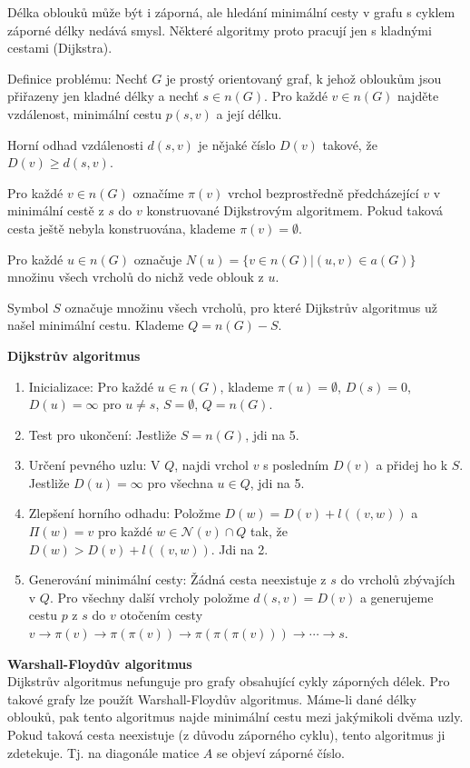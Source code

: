 \documentclass[a4]{report}
\theoremstyle{definition}
\begin{document}
Délka oblouků může být i záporná, ale hledání minimální cesty v grafu s cyklem záporné délky nedává smysl. Některé algoritmy proto pracují jen s kladnými cestami (Dijkstra).

Definice problému: Nechť $G$ je prostý orientovaný graf, k jehož obloukům jsou přiřazeny jen kladné délky a nechť $s \in n(G)$. Pro každé $v \in n(G)$ najděte vzdálenost, minimální cestu $p(s,v)$ a její délku.

Horní odhad vzdálenosti $d(s,v)$ je nějaké číslo $D(v)$ takové, že $D(v) \geq d(s,v)$. 

Pro každé $v \in n(G)$ označíme $\pi(v)$ vrchol bezprostředně předcházející $v$ v minimální cestě z $s$ do $v$ konstruované Dijkstrovým algoritmem. Pokud taková cesta ještě nebyla konstruována, klademe $\pi(v) = \emptyset$.

Pro každé $u \in n(G)$ označuje $N(u) = \{ v \in n(G) | (u,v) \in a(G) \}$ množinu všech vrcholů do nichž vede oblouk z $u$.

Symbol $S$ označuje množinu všech vrcholů, pro které Dijkstrův algoritmus už našel minimální cestu. Klademe $Q = n(G) - S$.

\textbf{Dijkstrův algoritmus}
\begin{enumerate}
    \item Inicializace: Pro každé $u\in n(G)$, klademe $\pi(u)=\emptyset$, $D(s)=0$, $D(u)=\infty$ pro $u\neq s$, $S=\emptyset$, $Q=n(G)$.
    \item Test pro ukončení: Jestliže $S=n(G)$, jdi na 5.
    \item Určení pevného uzlu: V $Q$, najdi vrchol $v$ s posledním $D(v)$ a přidej ho k $S$. Jestliže $D(u)=\infty$ pro všechna $u\in Q$, jdi na 5.
    \item Zlepšení horního odhadu: Položme $D(w)=D(v)+l((v,w))$ a
$\Pi(w)=v$ pro každé $w \in \mathcal{N} (v)  \cap Q$ tak, že $D(w)> D(v)+l((v,w))$. Jdi na 2.
    \item Generování minimální cesty: Žádná cesta neexistuje z $s$ do vrcholů zbývajích v $Q$. Pro všechny další vrcholy položme $d(s,v)=D(v)$ a generujeme cestu $p$ z $s$ do $v$ otočením cesty 
$v\rightarrow\pi(v)\rightarrow\pi(\pi(v))\rightarrow\pi(\pi(\pi(v)))\rightarrow\cdots\rightarrow s$.
\end{enumerate}


\textbf{Warshall-Floydův algoritmus}\\
Dijkstrův algoritmus nefunguje pro grafy obsahující cykly záporných délek. Pro takové grafy lze použít Warshall-Floydův algoritmus. Máme-li dané délky oblouků, pak tento algoritmus najde minimální cestu mezi jakýmikoli dvěma uzly. Pokud taková cesta neexistuje (z důvodu záporného cyklu), tento algoritmus ji zdetekuje. Tj. na diagonále matice $A$ se objeví záporné číslo.
\end{document}
